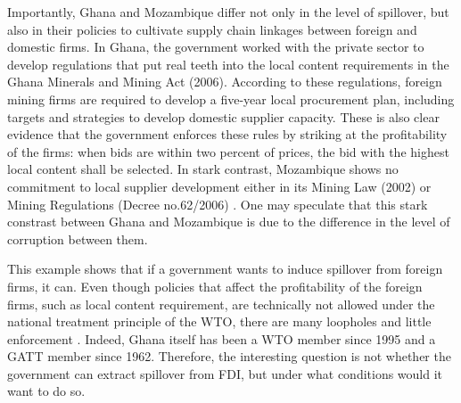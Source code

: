 Importantly, Ghana and Mozambique differ not only in the level of spillover, but also in their policies to cultivate supply chain linkages between foreign and domestic firms.  In Ghana, the government worked with the private sector to develop regulations that put real teeth into the local content requirements in the Ghana Minerals and Mining Act (2006). According to these regulations, foreign mining firms are required to develop a five-year local procurement plan, including targets and strategies to develop domestic supplier capacity. These is also clear evidence that the government enforces these rules by striking at the profitability of the firms: when bids are within two percent of prices, the bid with the highest local content shall be selected. In stark contrast, Mozambique shows no commitment to local supplier development either in its Mining Law (2002) or Mining Regulations (Decree no.62/2006) \citep[137]{Farole2014}. One may speculate that this stark constrast between Ghana and Mozambique is due to the difference in the level of corruption between them.

This example shows that if a government wants to induce spillover from foreign firms, it can. Even though policies that affect the profitability of the foreign firms, such as local content requirement, are technically not allowed under the national treatment principle of the WTO, there are many loopholes and little enforcement \citep{Hufbauer2013}. Indeed, Ghana itself has been a WTO member since 1995 and a GATT member since 1962. Therefore, the interesting question is not whether the government can extract spillover from FDI, but under what conditions would it want to do so.
